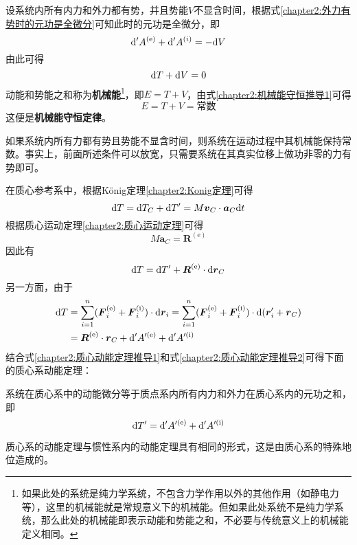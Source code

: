 设系统内所有内力和外力都有势，并且势能$V$不显含时间，根据式\eqref{chapter2:外力有势时的元功是全微分}可知此时的元功是全微分，即
\begin{equation}
	\mathrm{d}' A^{(\mathrm{e})} + \mathrm{d}' A^{(i)} = -\mathrm{d} V
\end{equation}
由此可得
\begin{equation}
	\mathrm{d} T+ \mathrm{d} V = 0
	\label{chapter2:机械能守恒推导1}
\end{equation}
动能和势能之和称为{\bf 机械能}\footnote{如果此处的系统是纯力学系统，不包含力学作用以外的其他作用（如静电力等），这里的机械能就是常规意义下的机械能。但如果此处系统不是纯力学系统，那么此处的机械能即表示动能和势能之和，不必要与传统意义上的机械能定义相同。}，即$E=T+V$，由式\eqref{chapter2:机械能守恒推导1}可得
\begin{equation}
	E = T + V = \text{常数}
\end{equation}
这便是{\bf 机械能守恒定律}。
\begin{theorem}[机械能守恒定律]
	如果系统内所有力都有势且势能不显含时间，则系统在运动过程中其机械能保持常数。事实上，前面所述条件可以放宽，只需要系统在其真实位移上做功非零的力有势即可。
\end{theorem}

在质心参考系中，根据K\"onig定理\ref{chapter2:Konig定理}可得
\begin{equation}
	\mathrm{d} T = \mathrm{d} T_C + \mathrm{d} T' = M\boldsymbol{v}_C \cdot \boldsymbol{a}_C\mathrm{d} t
\end{equation}
根据质心运动定理\ref{chapter2:质心运动定理}可得
\begin{equation}
	M\boldsymbol{a}_C = \boldsymbol{R}^{(\mathrm{e})}
\end{equation}
因此有
\begin{equation}
	\mathrm{d} T = \mathrm{d} T' + \boldsymbol{R}^{(\mathrm{e})} \cdot \mathrm{d} \boldsymbol{r}_C
	\label{chapter2:质心动能定理推导1}
\end{equation}
另一方面，由于
\begin{align}
	\mathrm{d} T & = \sum_{i=1}^n (\boldsymbol{F}_i^{(\mathrm{e})} + \boldsymbol{F}_i^{(\mathrm{i})}) \cdot \mathrm{d} \boldsymbol{r}_i = \sum_{i=1}^n (\boldsymbol{F}_i^{(\mathrm{e})} + \boldsymbol{F}_i^{(\mathrm{i})}) \cdot \mathrm{d} (\boldsymbol{r}_i' + \boldsymbol{r}_C) \nonumber \\ 
	& = \boldsymbol{R}^{(\mathrm{e})} \cdot \boldsymbol{r}_C + \mathrm{d}' A'^{(\mathrm{e})} + \mathrm{d}' A'^{(\mathrm{i})}
	\label{chapter2:质心动能定理推导2}
\end{align}
结合式\eqref{chapter2:质心动能定理推导1}和式\eqref{chapter2:质心动能定理推导2}可得下面的质心系动能定理：
\begin{theorem}[质心系的动能定理]
	系统在质心系中的动能微分等于质点系内所有内力和外力在质心系内的元功之和，即
	\begin{equation}
		\mathrm{d}T' = \mathrm{d}' A'^{(\mathrm{e})} + \mathrm{d}' A'^{(\mathrm{i})}
	\end{equation}
\end{theorem}
质心系的动能定理与惯性系内的动能定理具有相同的形式，这是由质心系的特殊地位造成的。


